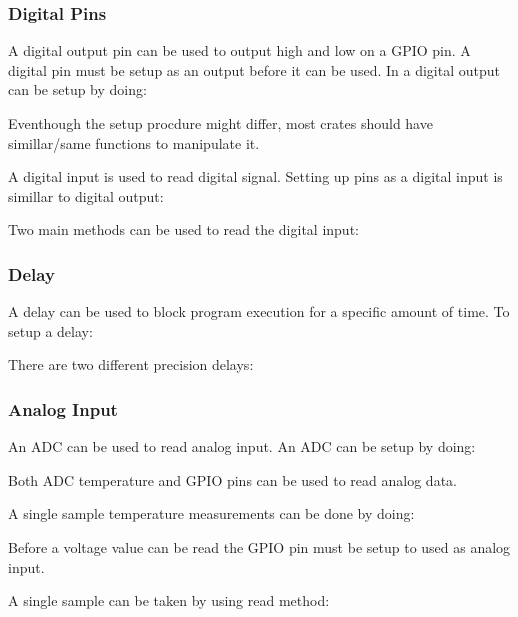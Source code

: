 \documentclass{beamer}
\begin{document}
\begin{frame}[allowframebreaks]
  \frametitle{Digital Pins}
  A digital output pin can be used to output high and low on a GPIO pin. A digital pin must be setup as an output before it can be used. In  a digital output can be setup by doing:
  

  Eventhough the setup procdure might differ, most crates should have simillar/same functions to manipulate it.
  
  

  A digital input is used to read digital signal. Setting up pins as a digital input is simillar to digital output:
  

  \pagebreak

  Two main methods can be used to read the digital input:
  
  
\end{frame}

\begin{frame}
  \frametitle{Delay}
  A delay can be used to block program execution for a specific amount of time. To setup a delay:
  

  There are two different precision delays:
  
  
\end{frame}

\begin{frame}[allowframebreaks]
  \frametitle{Analog Input}
  An ADC can be used to read analog input. An ADC can be setup by doing:
  

  Both ADC temperature and GPIO pins can be used to read analog data.

  A single sample temperature measurements can be done by doing:
  

  \pagebreak

  Before a voltage value can be read the GPIO pin must be setup to used as analog input.
  

  A single sample can be taken by using read method:
  
\end{frame}
\end{document}
